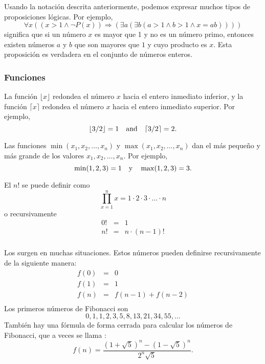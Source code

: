 Usando la notación descrita anteriormente,
podemos expresar muchos tipos de proposiciones lógicas.
Por ejemplo,
\[\forall x ((x>1 \land \lnot P(x)) \Rightarrow (\exists a (\exists b (a > 1 \land b > 1 \land x = ab))))\]
significa que si un número $x$ es mayor que 1
y no es un número primo,
entonces existen números $a$ y $b$
que son mayores que $1$ y cuyo producto es $x$.
Esta proposición es verdadera en el conjunto de números enteros.

\subsubsection{Funciones}

La función $\lfloor x \rfloor$ redondea el número $x$
hacia el entero inmediato inferior, y la función
$\lceil x \rceil$ redondea el número $x$
hacia el entero inmediato superior. Por ejemplo,
\[ \lfloor 3/2 \rfloor = 1 \hspace{10px} \textrm{and} \hspace{10px} \lceil 3/2 \rceil = 2.\]

Las funciones $\min(x_1,x_2,\ldots,x_n)$
y $\max(x_1,x_2,\ldots,x_n)$
dan el más pequeño y más grande de los valores
$x_1,x_2,\ldots,x_n$.
Por ejemplo,
\[ \min(1,2,3)=1 \hspace{10px} \textrm{y} \hspace{10px} \max(1,2,3)=3.\]


El  $n!$ se puede definir como
\[\prod_{x=1}^n x = 1 \cdot 2 \cdot 3 \cdot \ldots \cdot n\]
o recursivamente
\[
\begin{array}{lcl}
0! & = & 1 \\
n! & = & n \cdot (n-1)! \\
\end{array}
\]


Los 
surgen en muchas situaciones.
Estos números pueden definirse recursivamente de la siguiente manera:
\[
\begin{array}{lcl}
f(0) & = & 0 \\
f(1) & = & 1 \\
f(n) & = & f(n-1)+f(n-2) \\
\end{array}
\]
Los primeros números de Fibonacci son
\[0, 1, 1, 2, 3, 5, 8, 13, 21, 34, 55, \ldots\]
También hay una fórmula de forma cerrada
para calcular los números de Fibonacci, que a veces se llama
 :
\[f(n)=\frac{(1 + \sqrt{5})^n - (1-\sqrt{5})^n}{2^n \sqrt{5}}.\]

